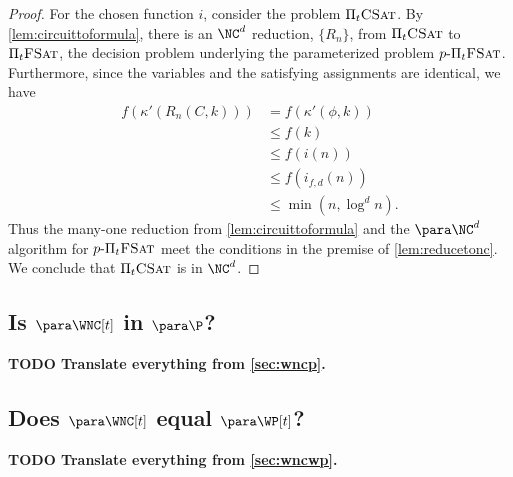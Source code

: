 \documentclass{article}
\newcommand{\todo}[1]{\textbf{TODO #1}}
\newcommand{\dash}{\textnormal{-}}
\newcommand{\pPiFSAT}{p \dash \Pi_t \textsc{FSat}}
\newcommand{\PiFSAT}{\Pi_t \textsc{FSat}}
\newcommand{\PiCSAT}{\Pi_t \textsc{CSat}}
\begin{document}
\begin{proof}
  For the chosen function $i$, consider the problem $\PiCSAT$.
  By \autoref{lem:circuittoformula}, there is an $\NC^d$ reduction, $\{R_n\}$, from $\PiCSAT$ to $\PiFSAT$, the decision problem underlying the parameterized problem $\pPiFSAT$.
  Furthermore, since the variables and the satisfying assignments are identical, we have
  \begin{align*}
    f(\kappa'(R_n(C, k))) & = f(\kappa'(\phi, k)) \\
    & \leq f(k) \\
    & \leq f(i(n)) \\
    & \leq f(i_{f, d}(n)) \\
    & \leq \min(n, \log^d n).
  \end{align*}
  Thus the many-one reduction from \autoref{lem:circuittoformula} and the $\para \NC^d$ algorithm for $\pPiFSAT$ meet the conditions in the premise of \autoref{lem:reducetonc}.
  We conclude that $\PiCSAT$ is in $\NC^d$.
\end{proof}

\subsection{Is \texorpdfstring{$\para \WNC[t]$}{paraWNC[t]} in \texorpdfstring{$\para \P$}{paraP}?}

\todo{Translate everything from \autoref{sec:wncp}.}

\subsection{Does \texorpdfstring{$\para \WNC[t]$}{paraWNC[t]} equal \texorpdfstring{$\para \WP[t]$}{paraWP[t]}?}

\todo{Translate everything from \autoref{sec:wncwp}.}

\printbibliography
\end{document}
